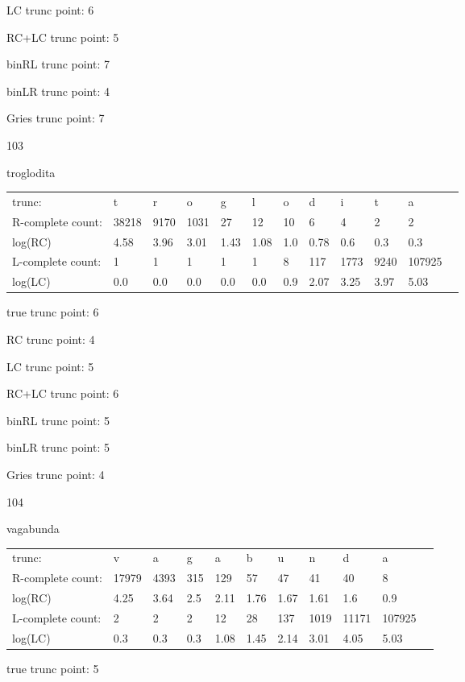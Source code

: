 \documentclass[10pt]{article}
\begin{document}
LC trunc point: 6

RC+LC trunc point: 5

binRL trunc point: 7

binLR trunc point: 4

Gries trunc point: 7

\vspace{1em}

103

troglodita

\begin{tabular}{l|lllllllllll}
trunc: & t & r & o & g & l & o & d & i & t & a & \\ 
R-complete count: & 38218 & 9170 & 1031 & 27 & 12 & 10 & 6 & 4 & 2 & 2 & \\ 
log(RC) & 4.58 & 3.96 & 3.01 & 1.43 & 1.08 & 1.0 & 0.78 & 0.6 & 0.3 & 0.3 & \\ 
L-complete count: & 1 & 1 & 1 & 1 & 1 & 8 & 117 & 1773 & 9240 & 107925 & \\ 
log(LC) & 0.0 & 0.0 & 0.0 & 0.0 & 0.0 & 0.9 & 2.07 & 3.25 & 3.97 & 5.03 & \\ 
\end{tabular}

true trunc point: 6

RC trunc point: 4

LC trunc point: 5

RC+LC trunc point: 6

binRL trunc point: 5

binLR trunc point: 5

Gries trunc point: 4

\vspace{1em}

104

vagabunda

\begin{tabular}{l|llllllllll}
trunc: & v & a & g & a & b & u & n & d & a & \\ 
R-complete count: & 17979 & 4393 & 315 & 129 & 57 & 47 & 41 & 40 & 8 & \\ 
log(RC) & 4.25 & 3.64 & 2.5 & 2.11 & 1.76 & 1.67 & 1.61 & 1.6 & 0.9 & \\ 
L-complete count: & 2 & 2 & 2 & 12 & 28 & 137 & 1019 & 11171 & 107925 & \\ 
log(LC) & 0.3 & 0.3 & 0.3 & 1.08 & 1.45 & 2.14 & 3.01 & 4.05 & 5.03 & \\ 
\end{tabular}

true trunc point: 5
\end{document}
